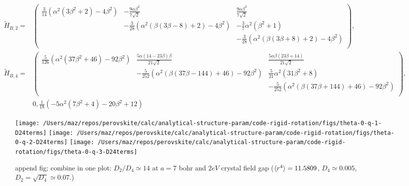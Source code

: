 \documentclass[a4paper,prb]{revtex4-1}  %
\begin{document}
{\begin{align} 
\tilde H_{B,2} =& 
\left(
\begin{array}{ccc}
 \frac{3}{14} \left(\alpha ^2 \left(3 \beta ^2+2\right)-4 \beta ^2\right) & -\frac{9 \alpha  \beta ^2}{7 \sqrt{2}} & \frac{9 \alpha  \beta ^2}{7 \sqrt{2}} \\
 & -\frac{3}{28} \left(\alpha ^2 (\beta  (3 \beta -8)+2)-4 \beta ^2\right) & -\frac{3}{7} \alpha ^2 \left(\beta ^2+1\right) \\
  &  & -\frac{3}{28}\left(\alpha ^2 (\beta  (3 \beta +8)+2)-4 \beta ^2\right) \\
\end{array}
\right),\\
\tilde H_{B,4} =& 
\left(
\begin{array}{ccc}
 \frac{5}{126} \left(\alpha ^2 \left(37 \beta ^2+46\right)-92 \beta ^2\right) & \frac{5 \alpha  (14-23 \beta ) \beta }{21 \sqrt{2}} & \frac{5 \alpha  \beta  (23 \beta +14)}{21 \sqrt{2}} \\
 & -\frac{5}{252}\left(\alpha ^2 (\beta  (37 \beta -144)+46)-92 \beta ^2\right) & \frac{5}{21} \alpha ^2 \left(31 \beta ^2+8\right) \\
 & & -\frac{5}{252}\left(\alpha ^2 (\beta  (37 \beta +144)+46)-92 \beta ^2\right) \\
\end{array}
\right),\\
&0,\frac{1}{18} \left(-5 \alpha ^2 \left(7 \beta ^2+4\right)-20 \beta ^2+12\right) 
\end{align}







\begin{figure}[htbp]
\begin{center}
\texttt{[image: /Users/maz/repos/perovskite/calc/analytical-structure-param/code-rigid-rotation/figs/theta-0-q-1-D24terms]}
\texttt{[image: /Users/maz/repos/perovskite/calc/analytical-structure-param/code-rigid-rotation/figs/theta-0-q-2-D24terms]}
\texttt{[image: /Users/maz/repos/perovskite/calc/analytical-structure-param/code-rigid-rotation/figs/theta-0-q-3-D24terms]}
\caption{append fig; combine in one plot: $D_2/D_4\simeq 14$ at 
$a=7$ bohr and $2eV$ crystal field gap ($\braket{r^4}=11.5809$, $D_4\simeq0.005$, $D_2=\sqrt{D_4}\simeq0.07$.)
}
\label{default}
\end{center}
\end{figure}






}
\end{document}
